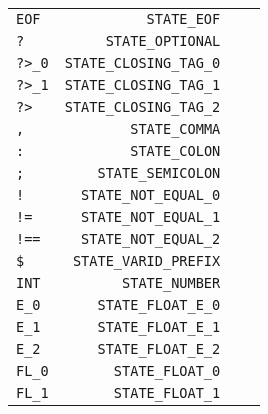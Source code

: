 \documentclass[a4paper,12pt]{article}
\begin{document}
\begin{tabular}{l r l r }
	\verb|EOF|  & \; \verb|STATE_EOF|             &                        &                                    \\
	\verb|?|    & \; \verb|STATE_OPTIONAL|        &                        &                                    \\
	\verb|?>_0| & \verb|STATE_CLOSING_TAG_0|      &                        &                                    \\
	\verb|?>_1| & \verb|STATE_CLOSING_TAG_1|      &                        &                                    \\
	\verb|?>|   & \verb|STATE_CLOSING_TAG_2|      &                        &                                    \\
	\verb|,|    & \verb|STATE_COMMA|              &                        &                                    \\
	\verb|:|    & \verb|STATE_COLON|              &                        &                                    \\
	\verb|;|    & \verb|STATE_SEMICOLON|          &                        &                                    \\
	\verb|!|    & \verb|STATE_NOT_EQUAL_0|        &                        &                                    \\
	\verb|!=|   & \verb|STATE_NOT_EQUAL_1|        &                        &                                    \\
	\verb|!==|  & \verb|STATE_NOT_EQUAL_2|        &                        &                                    \\
	\verb|$|    & \verb|STATE_VARID_PREFIX|       &                        &                                    \\
	\verb|INT|  & \verb|STATE_NUMBER|             &                        &                                    \\
	\verb|E_0|  & \verb|STATE_FLOAT_E_0|          &                        &                                    \\
	\verb|E_1|  & \verb|STATE_FLOAT_E_1|          &                        &                                    \\
	\verb|E_2|  & \verb|STATE_FLOAT_E_2|          &                        &                                    \\
	\verb|FL_0| & \verb|STATE_FLOAT_0|            &                        &                                    \\
	\verb|FL_1| & \verb|STATE_FLOAT_1|            &                        &                                    \\
\end{tabular}
\end{document}
